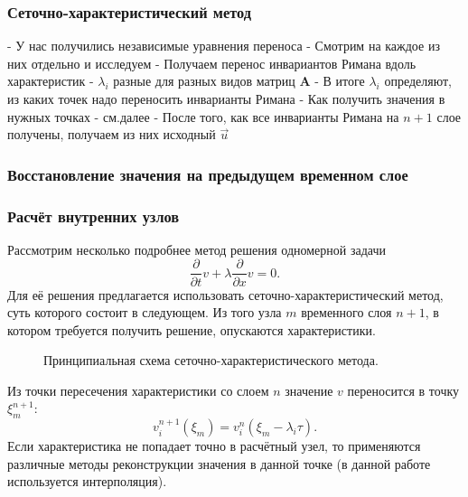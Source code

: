 \subsubsection{Сеточно-характеристический метод}


- У нас получились независимые уравнения переноса
- Смотрим на каждое из них отдельно и исследуем
- Получаем перенос инвариантов Римана вдоль характеристик
- $\lambda_i$ разные для разных видов матриц $\mathbf A$
- В итоге $\lambda_i$ определяют, из каких точек надо переносить инварианты Римана
- Как получить значения в нужных точках - см.далее
- После того, как все инварианты Римана на $n+1$ слое получены, получаем из них исходный $\vec u$


\subsubsection{Восстановление значения на предыдущем временном слое}


\subsubsection{Расчёт внутренних узлов}
Рассмотрим несколько подробнее метод решения одномерной задачи
\begin{equation}
\frac{\partial}{\partial t}v+\lambda \frac{\partial}{\partial x}v = 0.
\label{one_dim_eq}
\end{equation}
Для её решения предлагается использовать сеточно-характеристический метод, суть
которого состоит в следующем. Из того узла $m$ временного слоя $n+1$, в котором
требуется получить решение, опускаются характеристики.
\begin{figure}[h]
\caption{Принципиальная схема сеточно-характеристического метода.}
\end{figure}
Из точки пересечения характеристики со слоем $n$ значение $v$ переносится в 
точку $\xi^{n+1}_m$:
$$v_i^{n+1}(\xi_m)=v^{n}_i(\xi_m-\lambda_i\tau).$$
Если характеристика не попадает точно в расчётный узел, то применяются различные
методы реконструкции значения в данной точке (в данной работе используется
интерполяция).

